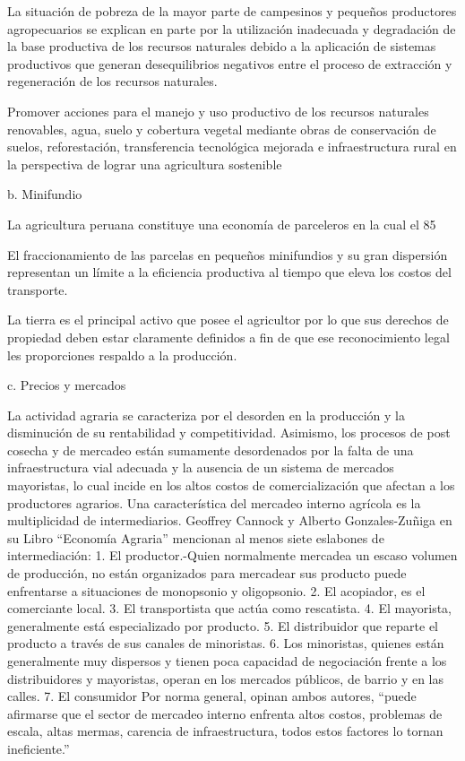 \documentclass{report}
\begin{document}
La situación de pobreza de la mayor parte de campesinos y pequeños productores agropecuarios se explican en parte por la utilización inadecuada y degradación de la base productiva de los recursos naturales debido a la aplicación de sistemas productivos que generan desequilibrios negativos entre el proceso de extracción y regeneración de los recursos naturales.

Promover acciones para el manejo y uso productivo de los recursos naturales renovables, agua, suelo y cobertura vegetal mediante obras de conservación de suelos, reforestación, transferencia tecnológica mejorada e infraestructura rural en la perspectiva de lograr una agricultura sostenible

b. Minifundio

La agricultura peruana constituye una economía de parceleros en la cual el 85%

El fraccionamiento de las parcelas en pequeños minifundios y su gran dispersión representan un límite a la eficiencia productiva al tiempo que eleva los costos del transporte.

La tierra es el principal activo que posee el agricultor por lo que sus derechos
de propiedad deben estar claramente definidos a fin de que ese reconocimiento
legal les proporciones respaldo a la producción.

c. Precios y mercados

La actividad agraria se caracteriza por el desorden en la producción y la disminución de su rentabilidad y competitividad. Asimismo, los procesos de post cosecha y de mercadeo están sumamente desordenados por la falta de una infraestructura vial adecuada y la ausencia de un sistema de mercados mayoristas, lo cual incide en los altos costos de comercialización que afectan a los productores agrarios.
Una característica del mercadeo interno agrícola es la multiplicidad de intermediarios. Geoffrey Cannock y Alberto Gonzales-Zuñiga en su Libro “Economía Agraria” mencionan al menos siete eslabones de intermediación:
1. El productor.-Quien normalmente mercadea un escaso volumen de producción, no están organizados para mercadear sus producto puede enfrentarse a situaciones de monopsonio y oligopsonio.
2. El acopiador, es el comerciante local.
3. El transportista que actúa como rescatista.
4. El mayorista, generalmente está especializado por producto.
5. El distribuidor que reparte el producto a través de sus canales de minoristas.
6. Los minoristas, quienes están generalmente muy dispersos y tienen poca capacidad de negociación frente a los distribuidores y mayoristas, operan en los mercados públicos, de barrio y en las calles.
7. El consumidor
Por norma general, opinan ambos autores, “puede afirmarse que el sector de mercadeo interno enfrenta altos costos, problemas de escala, altas mermas, carencia de infraestructura, todos estos factores lo tornan ineficiente.”
\end{document}
